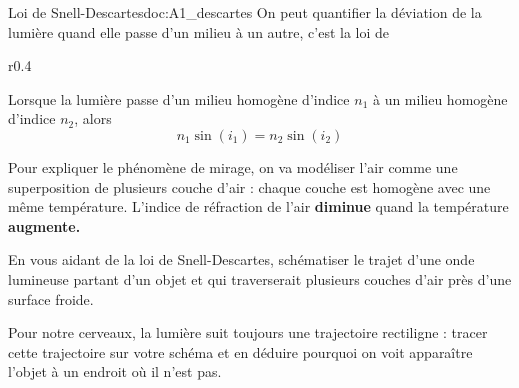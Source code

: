 \begin{doc}{Loi de Snell-Descartes}{doc:A1_descartes}
  On peut quantifier la déviation de la lumière quand elle passe d'un milieu à un autre, c'est la loi de 

  \vspace*{-16pt}
  \begin{wrapfigure}{r}{0.4\linewidth}
    \centering
  \end{wrapfigure}
  \phantom{b}
  \begin{encart}
    Lorsque la lumière passe d'un milieu homogène d'indice $n_1$ à un milieu homogène d'indice $n_2$, alors
    \begin{equation*}
      n_1 \sin(i_1) = n_2 \sin(i_2)
    \end{equation*}
  \end{encart}
  \phantom{b}
\end{doc}

\mesure
Pour expliquer le phénomène de mirage, on va modéliser l'air comme une superposition de plusieurs couche d'air : chaque couche est homogène avec une même température.
L'indice de réfraction de l'air \textbf{diminue} quand la température \textbf{augmente.}

En vous aidant de la loi de Snell-Descartes, schématiser le trajet d'une onde lumineuse partant d'un objet et qui traverserait plusieurs couches d'air près d'une surface froide.

\mesure 
Pour notre cerveaux, la lumière suit toujours une trajectoire rectiligne : tracer cette trajectoire sur votre schéma et en déduire pourquoi on voit apparaître l'objet à un endroit où il n'est pas.
